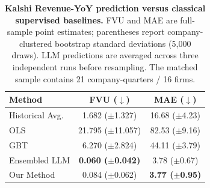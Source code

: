 \begin{table}[t]
\centering
\caption{\textbf{Kalshi Revenue-YoY prediction versus classical supervised baselines.}
FVU and MAE are full-sample point estimates; parentheses report company-clustered
bootstrap standard deviations (5,000 draws). LLM predictions are averaged across three
independent runs before resampling. The matched sample contains 21 company-quarters / 16 firms.}
\label{tab:kalshi_baselines}
\begin{tabular}{lcc}
\toprule
Method & FVU ($\downarrow$) & MAE ($\downarrow$) \\
\midrule
Historical Avg. & 1.682 ($\pm$1.327) & 16.68 ($\pm$4.23) \\
OLS & 21.795 ($\pm$11.057) & 82.53 ($\pm$9.16) \\
GBT & 6.270 ($\pm$2.824) & 44.11 ($\pm$3.79) \\
Ensembled LLM & \textbf{0.060 ($\pm$0.042)} & 3.78 ($\pm$0.67) \\
Our Method & 0.084 ($\pm$0.062) & \textbf{3.77 ($\pm$0.95)} \\
\bottomrule
\end{tabular}
\end{table}
